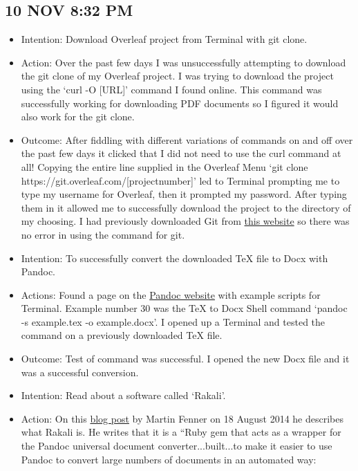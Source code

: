 \documentclass{article}
\begin{document}
\subsection{10 NOV 8:32 PM}

\begin{itemize}
    \item Intention: Download Overleaf project from Terminal with git clone.
    \item Action: Over the past few days I was unsuccessfully attempting to download the git clone of my Overleaf project. I was trying to download the project using the `curl -O [URL]' command I found online. This command was successfully working for downloading PDF documents so I figured it would also work for the git clone.
    \item Outcome: After fiddling with different variations of commands on and off over the past few days it clicked that I did not need to use the curl command at all! Copying the entire line supplied in the Overleaf Menu `git clone https://git.overleaf.com/[projectnumber]' led to Terminal prompting me to type my username for Overleaf, then it prompted my password. After typing them in it allowed me to successfully download the project to the directory of my choosing. I had previously downloaded Git from \href{https://git-scm.com/downloads}{this website} so there was no error in using the command for git.
    \item Intention: To successfully convert the downloaded TeX file to Docx with Pandoc.
    \item Actions: Found a page on the \href{https://pandoc.org/demos.html}{Pandoc website} with example scripts for Terminal. Example number 30 was the TeX to Docx Shell command `pandoc -s example.tex -o example.docx'. I opened up a Terminal and tested the command on a previously downloaded TeX file.
    \item Outcome: Test of command was successful. I opened the new Docx file and it was a successful conversion.
    \item Intention: Read about a software called `Rakali'.
    \item Action: On this \href{https://blog.martinfenner.org/2014/08/18/introducing-rakali/}{blog post} by Martin Fenner on 18 August 2014 he describes what Rakali is. He writes that it is a ``Ruby gem that acts as a wrapper for the Pandoc universal document converter...built...to make it easier to use Pandoc to convert large numbers of documents in an automated way:
    \begin{itemize}

\end{itemize}
\end{itemize}
\end{document}
